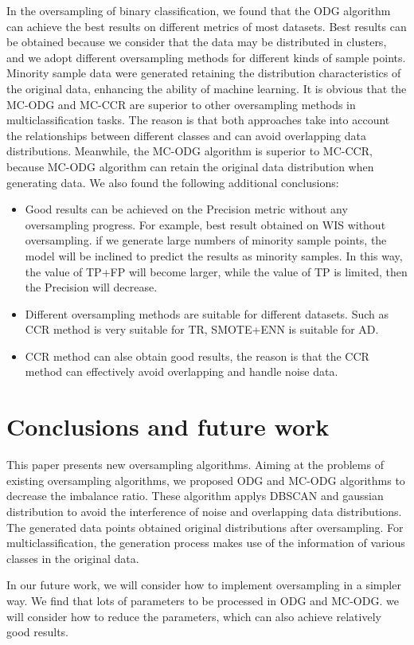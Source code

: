 \documentclass[ida]{iosart2x}
\begin{document}
In the oversampling of binary classification, 
we found that the ODG algorithm can achieve the best 
results on different metrics of most datasets.
Best results can be obtained because we consider 
that the data may be distributed in clusters, 
and we adopt different oversampling methods for different kinds of sample points.
Minority sample data were generated retaining 
the distribution characteristics of the original data, 
enhancing the ability of machine learning.
It is obvious that the MC-ODG and MC-CCR are superior 
to other oversampling methods in  
multiclassification tasks. 
The reason is that both approaches take into account 
the relationships between different classes and
can avoid overlapping data distributions.
Meanwhile, the MC-ODG algorithm is superior to MC-CCR, because MC-ODG
algorithm can retain the original data distribution when generating data.
We also found the following additional conclusions:
\begin{itemize}
  \item Good results can be achieved on the Precision metric without any oversampling progress. 
  For example, best result obtained on WIS without oversampling.
   if we generate large numbers of minority sample points, 
   the model will be inclined to predict the results as minority samples. In this way, 
   the value of TP+FP will become larger, while the value of TP is limited, then the Precision will decrease.
  \item Different oversampling methods are suitable for different datasets. 
  Such as CCR method is very suitable for TR, SMOTE+ENN is suitable for AD.
  \item CCR method can alse obtain good results, 
  the reason is that the CCR method can effectively avoid overlapping and handle noise data.
\end{itemize}

\section{Conclusions and future work}
This paper presents new oversampling algorithms.
Aiming at the problems of existing oversampling algorithms, we proposed ODG and MC-ODG algorithms
to decrease the imbalance ratio. 
These algorithm applys DBSCAN and gaussian distribution to avoid the interference of noise
and overlapping data distributions. The generated data points 
obtained original distributions after oversampling.
For multiclassification,
the generation process makes use of the 
information of various classes in the original data.

In our future work, we will consider how to implement oversampling in a simpler way.
We find that lots of parameters to be processed in ODG and MC-ODG. 
we will consider how to reduce the parameters, which can also achieve relatively good results.




\end{document}
